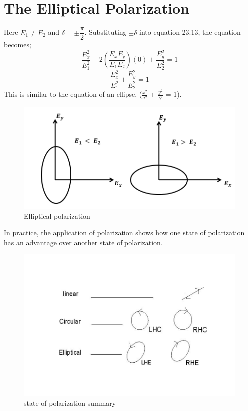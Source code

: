\section{The Elliptical Polarization}
Here $E_1\neq E_2$ and $\delta = \pm \dfrac{\pi}{2} $. Substituting $\pm \delta$ into equation 23.13, the equation becomes;
\begin{equation}
\frac{E_{x}^2}{E_{1}^2} -2(\frac{E_{x}E_{y}}{E_{1}E_{2}})(0) + \frac{E_{y}^2}{E_{2}^2} = 1
\end{equation}
\begin{equation}
\frac{E_{x}^2}{E_{1}^2} + \frac{E_{y}^2}{E_{2}^2} = 1
\end{equation}
This is similar to the equation of an ellipse, ($\frac{x^2}{a^2}$ + $\frac{y^2}{b^2}$ = 1).
\begin{figure}[h]
\centering
\includegraphics[width=1\linewidth]{./graphics/elliptical_polarization2}
\caption{Elliptical polarization}
\end{figure}

In practice, the application of polarization shows how one state of polarization has an advantage over another state of polarization.
\begin{figure}[h]
\centering
\includegraphics[width=1\linewidth]{./graphics/eee}
\caption{state of polarization summary}
\end{figure}

